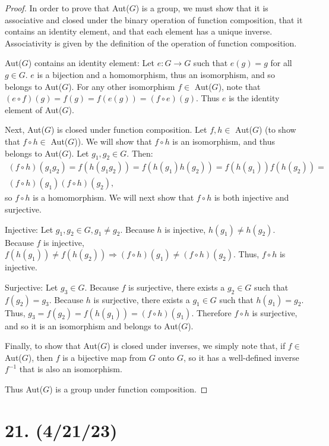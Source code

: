 \documentclass{article}
\begin{document}
\begin{proof}
    In order to prove that Aut($G$) is a group, we must show that it is associative and closed under the binary operation of function composition, that it contains an identity element, and that each element has a unique inverse. Associativity is given by the definition of the operation of function composition.

    Aut($G$) contains an identity element: Let $e: G \rightarrow G$ such that $e(g) = g$ for all $g \in G$. $e$ is a bijection and a homomorphism, thus an isomorphism, and so belongs to Aut($G$). For any other isomorphism $f \in$ Aut($G$), note that $(e \circ f)(g) = f(g) = f(e(g)) = (f \circ e)(g)$. Thus $e$ is the identity element of Aut($G$).

    Next, Aut($G$) is closed under function composition. Let $f, h \in$ Aut($G$) (to show that $f \circ h \in$ Aut($G$)). We will show that $f \circ h$ is an isomorphism, and thus belongs to Aut($G$). Let $g_1, g_2 \in G$. Then:
    \begin{multline*}
        (f \circ h)(g_1 g_2) = f(h(g_1 g_2)) = f(h(g_1) h(g_2)) = f(h(g_1)) f(h(g_2)) = \\ (f \circ h)(g_1) (f \circ h)(g_2),
    \end{multline*}
    so $f \circ h$ is a homomorphism. We will next show that $f \circ h$ is both injective and surjective.

    Injective: Let $g_1, g_2 \in G, g_1 \neq g_2$. Because $h$ is injective, $h(g_1) \neq h(g_2)$. Because $f$ is injective, $f(h(g_1)) \neq f(h(g_2)) \Rightarrow (f \circ h)(g_1) \neq (f \circ h)(g_2)$. Thus, $f \circ h$ is injective.

    Surjective: Let $g_3 \in G$. Because $f$ is surjective, there exists a $g_2 \in G$ such that $f(g_2) = g_3$. Because $h$ is surjective, there exists a $g_1 \in G$ such that $h(g_1) = g_2$. Thus, $g_3 = f(g_2) = f(h(g_1)) = (f \circ h)(g_1)$. Therefore $f \circ h$ is surjective, and so it is an isomorphism and belongs to Aut($G$).

    Finally, to show that Aut($G$) is closed under inverses, we simply note that, if $f \in$ Aut($G$), then $f$ is a bijective map from $G$ onto $G$, so it has a well-defined inverse $f^{-1}$ that is also an isomorphism.

    Thus Aut($G$) is a group under function composition.
\end{proof}

\section*{21. (4/21/23)}
\end{document}

